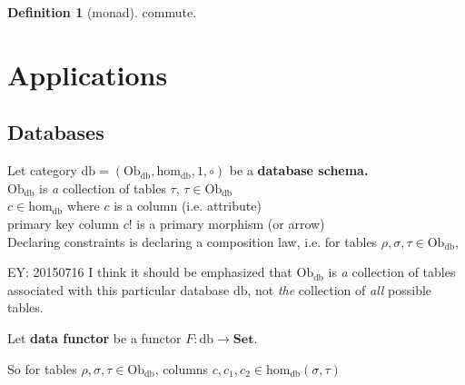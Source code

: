 \documentclass[twoside,landscape,10pt]{amsart}
\theoremstyle{plain}
\theoremstyle{definition}
\newtheorem{definition}{Definition}
\theoremstyle{remark}
\begin{document}
\begin{multicols*}{2}
\begin{definition}[monad]
commute.  



\end{definition}


\section{Applications}

\subsection{Databases}

Let category $\text{db} = (\text{Ob}_{\text{db}}, \text{hom}_{\text{db}}, 1,\circ)$ be a \textbf{database schema.}  \\
$\text{Ob}_{\text{db}}$ is \emph{a} collection of tables $\tau$, $\tau \in \text{Ob}_{\text{db}}$ \\
$c\in \text{hom}_{\text{db}}$ where $c$ is a column (i.e. attribute) \\
primary key column $c!$ is a primary morphism (or arrow) \\
Declaring constraints is declaring a composition law, i.e. for tables $\rho, \sigma, \tau \in \text{Ob}_{\text{db}}$, 


EY: 20150716 I think it should be emphasized that $\text{Ob}_{\text{db}}$ is \emph{a} collection of tables associated with this particular database $\text{db}$, not \emph{the} collection of \emph{all} possible tables.  

Let \textbf{data functor} be a functor $F: \text{db} \to \mathbf{\text{Set}}$. 

So for tables $\rho, \sigma, \tau \in \text{Ob}_{\text{db}}$, columns $c,c_1,c_2 \in \text{hom}_{\text{db}}(\sigma,\tau)$


\end{multicols*}
\end{document}
